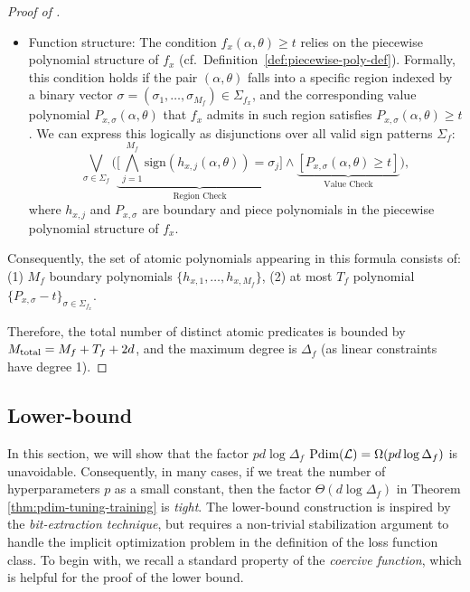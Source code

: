 \begin{proof}[Proof of ]
\begin{itemize}[leftmargin=*]
\begin{itemize}[leftmargin=*]
            \item Function structure: The condition $f_x(\alpha, \theta) \geq t$ relies on the piecewise polynomial structure of $f_x$ (cf.~Definition~\ref{def:piecewise-poly-def}). Formally, this condition holds if the pair $(\alpha, \theta)$ falls into a specific region indexed by a binary vector $\sigma = (\sigma_1, \dots, \sigma_{M_f}) \in \Sigma_{f_{x}}$, and the corresponding value polynomial $P_{x, \sigma}(\alpha, \theta)$ that $f_x$ admits in such region satisfies $P_{x, \sigma}(\alpha, \theta) \geq t$. We can express this logically as disjunctions over all valid sign patterns $\Sigma_f$:
            \[
                \bigvee_{\sigma \in \Sigma_f} \Big( \underbrace{\Big[ \bigwedge_{j=1}^{M_f} \text{sign}(h_{x, j}(\alpha, \theta)) = \sigma_j \Big]}_{\text{Region Check}} \land \underbrace{\left[ P_{x, \sigma}(\alpha, \theta) \ge t \right]}_{\text{Value Check}} \Big),
            \]
            where $h_{x, j}$ and $P_{x, \sigma}$ are boundary and piece polynomials in the piecewise polynomial structure of $f_x$.
        \end{itemize}
         Consequently, the set of atomic polynomials appearing in this formula consists of: (1) $M_f$ boundary polynomials $\{h_{x, 1}, \dots, h_{x, M_{f}}\}$, (2) at most $T_f$ polynomial $\{P_{x, \sigma} - t\}_{\sigma \in \Sigma_{f_x}}$. 
    \end{itemize}
    Therefore, the total number of distinct atomic predicates is bounded by $M_\textup{total} = M_f + T_f + 2d$, and the maximum degree is $\Delta_f$ (as linear constraints have degree 1). 
\end{proof}

\subsection{Lower-bound} \label{apx:lower-bound-proof}
    In this section, we will show that the factor $pd\log\Delta_f$ $\text{\normalfont Pdim}(\mathcal{L}) = \Omega(pd \log \Delta_f)$ is unavoidable. Consequently, in many cases, if we treat the number of hyperparameters $p$ as a small constant, then the factor $\Theta(d\log \Delta_f)$ in Theorem \ref{thm:pdim-tuning-training} is \textit{tight}. The lower-bound construction is inspired by the \textit{bit-extraction technique}, but requires a non-trivial stabilization argument to handle the implicit optimization problem in the definition of the loss function class. To begin with, we recall a standard property of the \textit{coercive function}, which is helpful for the proof of the lower bound.
    
